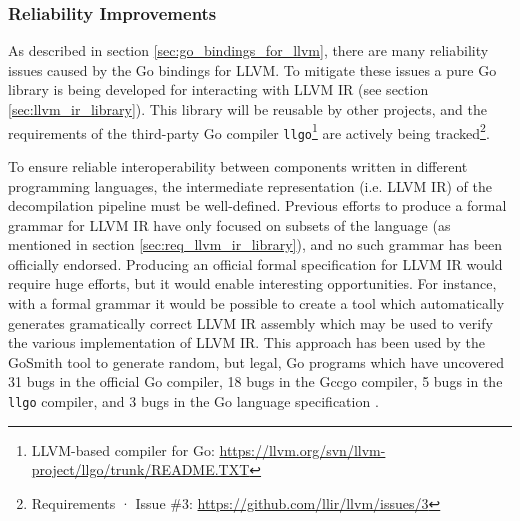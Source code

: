 
\subsubsection{Reliability Improvements}

As described in section \ref{sec:go_bindings_for_llvm}, there are many reliability issues caused by the Go bindings for LLVM. To mitigate these issues a pure Go library is being developed for interacting with LLVM IR (see section \ref{sec:llvm_ir_library}). This library will be reusable by other projects, and the requirements of the third-party Go compiler \texttt{llgo}\footnote{LLVM-based compiler for Go: \url{https://llvm.org/svn/llvm-project/llgo/trunk/README.TXT}} are actively being tracked\footnote{Requirements · Issue \#3: \url{https://github.com/llir/llvm/issues/3}}.

To ensure reliable interoperability between components written in different programming languages, the intermediate representation (i.e. LLVM IR) of the decompilation pipeline must be well-defined. Previous efforts to produce a formal grammar for LLVM IR have only focused on subsets of the language (as mentioned in section \ref{sec:req_llvm_ir_library}), and no such grammar has been officially endorsed. Producing an official formal specification for LLVM IR would require huge efforts, but it would enable interesting opportunities. For instance, with a formal grammar it would be possible to create a tool which automatically generates gramatically correct LLVM IR assembly which may be used to verify the various implementation of LLVM IR. This approach has been used by the GoSmith tool to generate random, but legal, Go programs which have uncovered 31 bugs in the official Go compiler, 18 bugs in the Gccgo compiler, 5 bugs in the \texttt{llgo} compiler, and 3 bugs in the Go language specification \cite{gosmith}.
